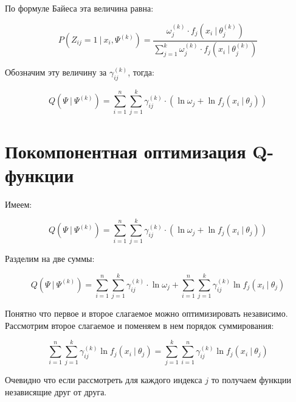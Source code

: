 \documentclass[14pt, a4paper, oneside]{memoir}
\begin{document}
По формуле Байеса эта величина равна:

\[P(Z_{ij} = 1 ~|~ x_i, \Psi^{(k)}) = \frac{\omega_j^{(k)} \cdot f_j(x_i~|~ \theta_j^{(k)})}{\sum_{j=1}^k \omega_j^{(k)} \cdot f_j(x_i~|~ \theta_j^{(k)})}\]

Обозначим эту величину за $\gamma_{ij}^{(k)}$, тогда:

\[Q(\Psi ~|~ \Psi^{(k)}) = \sum_{i=1}^n \sum_{j=1}^k \gamma_{ij}^{(k)} \cdot (\ln \omega_j + \ln f_j(x_i ~|~ \theta_j))\]

\section{Покомпонентная оптимизация Q-функции}

Имеем:

\[Q(\Psi ~|~ \Psi^{(k)}) = \sum_{i=1}^n \sum_{j=1}^k \gamma_{ij}^{(k)} \cdot (\ln \omega_j + \ln f_j(x_i ~|~ \theta_j))\]

Разделим на две суммы:

\[Q(\Psi ~|~ \Psi^{(k)}) =  \sum_{i=1}^n \sum_{j=1}^k \gamma_{ij}^{(k)} \cdot \ln \omega_j +  \sum_{i=1}^n \sum_{j=1}^k  \gamma_{ij}^{(k)} \ln f_j(x_i ~|~ \theta_j)\]

Понятно что первое и второе слагаемое можно оптимизировать независимо. Рассмотрим второе слагаемое и поменяем в нем порядок суммирования:

\[\sum_{i=1}^n \sum_{j=1}^k  \gamma_{ij}^{(k)} \ln f_j(x_i ~|~ \theta_j) = \sum_{j=1}^k \sum_{i=1}^n \gamma_{ij}^{(k)}\ln f_j(x_i ~|~ \theta_j)\]

Очевидно что если рассмотреть для каждого индекса $j$ то получаем функции независящие друг от друга.
\end{document}
